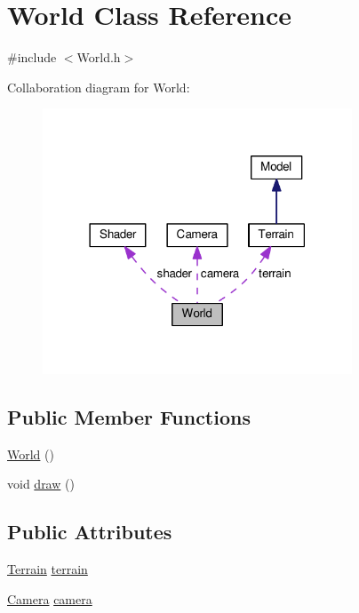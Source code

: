\hypertarget{class_world}{}\section{World Class Reference}
\label{class_world}


{\ttfamily \#include $<$World.\+h$>$}



Collaboration diagram for World\+:\nopagebreak
\begin{figure}[H]
\begin{center}
\leavevmode
\includegraphics[width=261pt]{class_world__coll__graph}
\end{center}
\end{figure}
\subsection*{Public Member Functions}
\begin{DoxyCompactItemize}
\item 
\hyperlink{class_world_afa39d4e6f714a7a3691ac0c656f5e8a8}{World} ()
\item 
void \hyperlink{class_world_ab51a17ccbb108616daacd0c34973dc8d}{draw} ()
\end{DoxyCompactItemize}
\subsection*{Public Attributes}
\begin{DoxyCompactItemize}
\item 
\hyperlink{class_terrain}{Terrain} \hyperlink{class_world_a7a580c4cbd8085edcd2fea787331ff57}{terrain}
\item 
\hyperlink{class_camera}{Camera} \hyperlink{class_world_afef936319256711ddc3f38b2c1ec521f}{camera}
\end{DoxyCompactItemize}
